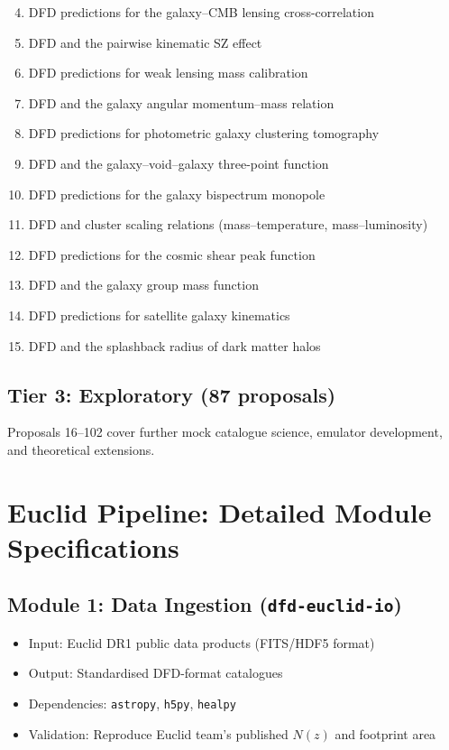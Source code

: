 \documentclass[11pt,a4paper]{article}
\begin{document}
\begin{enumerate}[nosep]
\setcounter{enumi}{3}
\item DFD predictions for the galaxy--CMB lensing cross-correlation
\item DFD and the pairwise kinematic SZ effect
\item DFD predictions for weak lensing mass calibration
\item DFD and the galaxy angular momentum--mass relation
\item DFD predictions for photometric galaxy clustering tomography
\item DFD and the galaxy--void--galaxy three-point function
\item DFD predictions for the galaxy bispectrum monopole
\item DFD and cluster scaling relations (mass--temperature, mass--luminosity)
\item DFD predictions for the cosmic shear peak function
\item DFD and the galaxy group mass function
\item DFD predictions for satellite galaxy kinematics
\item DFD and the splashback radius of dark matter halos
\end{enumerate}

\subsection{Tier 3: Exploratory (87 proposals)}

Proposals 16--102 cover further mock catalogue science, emulator development, and theoretical extensions.

\section{Euclid Pipeline: Detailed Module Specifications}

\subsection{Module 1: Data Ingestion (\texttt{dfd-euclid-io})}
\begin{itemize}[nosep]
\item Input: Euclid DR1 public data products (FITS/HDF5 format)
\item Output: Standardised DFD-format catalogues
\item Dependencies: \texttt{astropy}, \texttt{h5py}, \texttt{healpy}
\item Validation: Reproduce Euclid team's published $N(z)$ and footprint area
\end{itemize}
\end{document}
